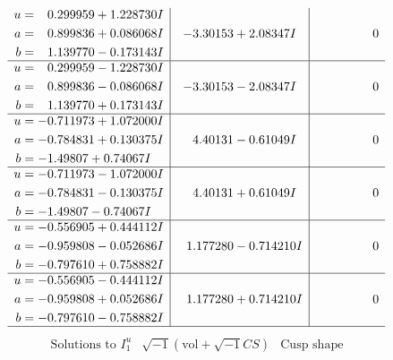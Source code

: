 \documentclass[1p]{elsarticle_modified}
\theoremstyle{definition}
\newcommand{\I}{\sqrt{-1}}
\begin{document}
$$\begin{array}{c|c|c}
\begin{aligned}
u &= \phantom{-}0.299959 + 1.228730 I \\
a &= \phantom{-}0.899836 + 0.086068 I \\
b &= \phantom{-}1.139770 - 0.173143 I\end{aligned}
 & -3.30153 + 2.08347 I & \phantom{-0.000000 } 0 \\ \hline\begin{aligned}
u &= \phantom{-}0.299959 - 1.228730 I \\
a &= \phantom{-}0.899836 - 0.086068 I \\
b &= \phantom{-}1.139770 + 0.173143 I\end{aligned}
 & -3.30153 - 2.08347 I & \phantom{-0.000000 } 0 \\ \hline\begin{aligned}
u &= -0.711973 + 1.072000 I \\
a &= -0.784831 + 0.130375 I \\
b &= -1.49807 + 0.74067 I\end{aligned}
 & \phantom{-}4.40131 - 0.61049 I & \phantom{-0.000000 } 0 \\ \hline\begin{aligned}
u &= -0.711973 - 1.072000 I \\
a &= -0.784831 - 0.130375 I \\
b &= -1.49807 - 0.74067 I\end{aligned}
 & \phantom{-}4.40131 + 0.61049 I & \phantom{-0.000000 } 0 \\ \hline\begin{aligned}
u &= -0.556905 + 0.444112 I \\
a &= -0.959808 - 0.052686 I \\
b &= -0.797610 + 0.758882 I\end{aligned}
 & \phantom{-}1.177280 - 0.714210 I & \phantom{-0.000000 } 0 \\ \hline\begin{aligned}
u &= -0.556905 - 0.444112 I \\
a &= -0.959808 + 0.052686 I \\
b &= -0.797610 - 0.758882 I\end{aligned}
 & \phantom{-}1.177280 + 0.714210 I & \phantom{-0.000000 } 0\\
 \hline 
 \end{array}$$\newpage$$\begin{array}{c|c|c}  
\text{Solutions to }I^u_{1}& \I (\text{vol} + \sqrt{-1}CS) & \text{Cusp shape}\\
 \hline 
\begin{aligned}

\end{aligned}
\end{array}$$
\end{document}
